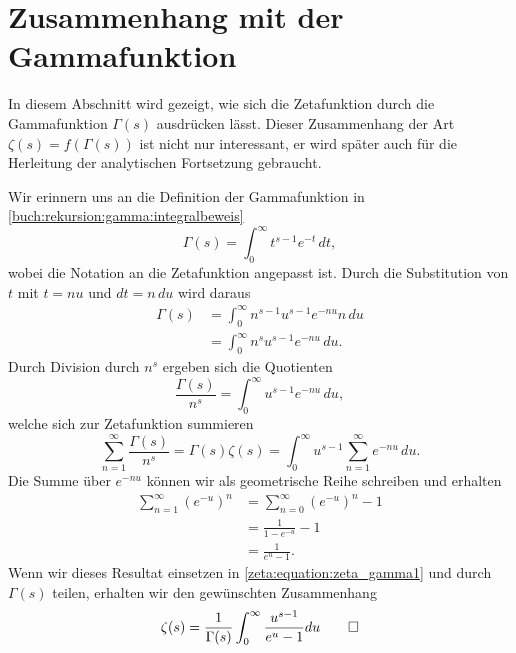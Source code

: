 \section{Zusammenhang mit der Gammafunktion} \label{zeta:section:zusammenhang_mit_gammafunktion}

In diesem Abschnitt wird gezeigt, wie sich die Zetafunktion durch die Gammafunktion $\Gamma(s)$ ausdrücken lässt.
Dieser Zusammenhang der Art $\zeta(s) = f(\Gamma(s))$ ist nicht nur interessant, er wird später auch für die Herleitung der analytischen Fortsetzung gebraucht.

Wir erinnern uns an die Definition der Gammafunktion in \eqref{buch:rekursion:gamma:integralbeweis}
\begin{equation*}
    \Gamma(s)
    =
    \int_0^{\infty} t^{s-1} e^{-t} \,dt,
\end{equation*}
wobei die Notation an die Zetafunktion angepasst ist.
Durch die Substitution von $t$ mit $t = nu$ und $dt = n\,du$ wird daraus
\begin{align*}
    \Gamma(s)
    &=
    \int_0^{\infty} n^{s-1}u^{s-1} e^{-nu} n \,du \\
    &=
    \int_0^{\infty} n^s u^{s-1} e^{-nu} \,du.
\end{align*}
Durch Division durch $n^s$ ergeben sich die Quotienten
\begin{equation*}
    \frac{\Gamma(s)}{n^s}
    =
    \int_0^{\infty} u^{s-1} e^{-nu} \,du,
\end{equation*}
welche sich zur Zetafunktion summieren
\begin{equation}
    \sum_{n=1}^{\infty} \frac{\Gamma(s)}{n^s}
    =
    \Gamma(s) \zeta(s)
    =
    \int_0^{\infty} u^{s-1}
    \sum_{n=1}^{\infty}e^{-nu}
    \,du.
    \label{zeta:equation:zeta_gamma1}
\end{equation}
Die Summe über $e^{-nu}$ können wir als geometrische Reihe schreiben und erhalten
\begin{align}
    \sum_{n=1}^{\infty}\left(e^{-u}\right)^n
    &=
    \sum_{n=0}^{\infty}\left(e^{-u}\right)^n
    -
    1
    \\
    &=
    \frac{1}{1 - e^{-u}} - 1
    \\
    &=
    \frac{1}{e^u - 1}.
\end{align}
Wenn wir dieses Resultat einsetzen in \eqref{zeta:equation:zeta_gamma1} und durch $\Gamma(s)$ teilen, erhalten wir den gewünschten Zusammenhang
\begin{equation}\label{zeta:equation:zeta_gamma_final}
    \zeta(s)
    =
    \frac{1}{\Gamma(s)}
    \int_0^{\infty}
    \frac{u^{s-1}}{e^u -1}
    du \qed
\end{equation}
